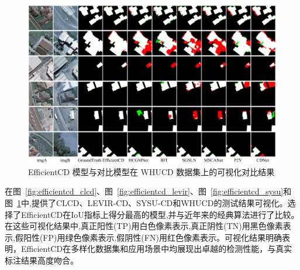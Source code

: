 \begin{figure}[!htb]
  \centering
  \includegraphics[width=\textwidth]{paper_figures/基于双时相遥感影像特征交互的变化检测算法研究/EfficientCD/efficientcd_whucd.png}
  \caption{EfficientCD 模型与对比模型在 WHUCD 数据集上的可视化对比结果}
  \label{fig:efficientcd_whucd}
\end{figure}

在图~\ref{fig:efficientcd_clcd}、图~\ref{fig:efficientcd_levir}、图~\ref{fig:efficientcd_sysu}和图~\ref{fig:efficientcd_whucd}中,提供了CLCD、LEVIR-CD、SYSU-CD和WHUCD的测试结果可视化。选择了EfficientCD在IoU指标上得分最高的模型,并与近年来的经典算法进行了比较。在这些可视化结果中,真正阳性(TP)用白色像素表示,真正阴性(TN)用黑色像素表示,假阳性(FP)用绿色像素表示,假阴性(FN)用红色像素表示。可视化结果明确表明，EfficientCD在多样化数据集和应用场景中均展现出卓越的检测性能，与真实标注结果高度吻合。

